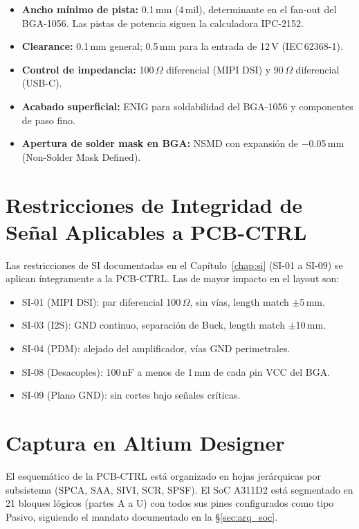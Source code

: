 \begin{fabbox}
  \begin{itemize}
    \item \textbf{Ancho mínimo de pista:} 0.1\,mm (4\,mil), determinante en el fan-out del BGA-1056. Las pistas de potencia siguen la calculadora IPC-2152.
    \item \textbf{Clearance:} 0.1\,mm general; 0.5\,mm para la entrada de 12\,V (IEC\,62368-1).
    \item \textbf{Control de impedancia:} 100\,$\Omega$ diferencial (MIPI DSI) y 90\,$\Omega$ diferencial (USB-C).
    \item \textbf{Acabado superficial:} ENIG para soldabilidad del BGA-1056 y componentes de paso fino.
    \item \textbf{Apertura de solder mask en BGA:} NSMD con expansión de $-$0.05\,mm (Non-Solder Mask Defined).
  \end{itemize}
\end{fabbox}

\section{Restricciones de Integridad de Señal Aplicables a PCB-CTRL}
\label{sec:ctrl_si}

Las restricciones de SI documentadas en el Capítulo~\ref{chap:si} (SI-01 a SI-09) se aplican íntegramente a la PCB-CTRL. Las de mayor impacto en el layout son:
\begin{itemize}
  \item SI-01 (MIPI DSI): par diferencial 100\,$\Omega$, sin vías, length match $\pm$5\,mm.
  \item SI-03 (I2S): GND continuo, separación de Buck, length match $\pm$10\,mm.
  \item SI-04 (PDM): alejado del amplificador, vías GND perimetrales.
  \item SI-08 (Desacoples): 100\,nF a menos de 1\,mm de cada pin VCC del BGA.
  \item SI-09 (Plano GND): sin cortes bajo señales críticas.
\end{itemize}

\section{Captura en Altium Designer}
\label{sec:ctrl_altium}

El esquemático de la PCB-CTRL está organizado en hojas jerárquicas por subsistema (SPCA, SAA, SIVI, SCR, SPSF). El SoC A311D2 está segmentado en 21 bloques lógicos (partes A a U) con todos sus pines configurados como tipo Pasivo, siguiendo el mandato documentado en la \S\ref{sec:arq_soc}.

